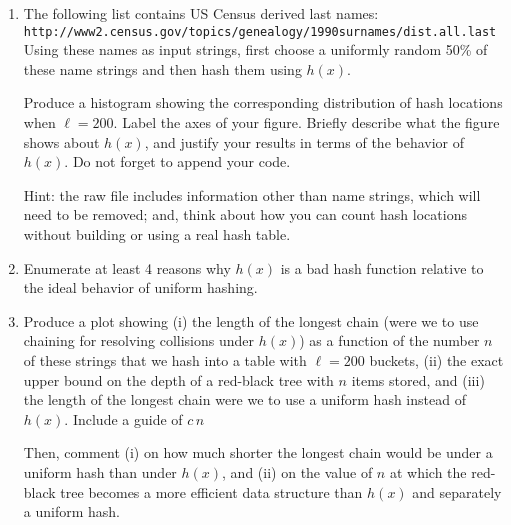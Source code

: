 \documentclass[12pt]{article}
\begin{document}
\begin{enumerate}
	\begin{enumerate}
    	\item The following list contains US Census derived last names: \\
    	{\tt http://www2.census.gov/topics/genealogy/1990surnames/dist.all.last} \\
    	Using these names as input strings, first choose a uniformly random 50\% of these name strings and then hash them using $h(x)$.
    	
    	Produce a histogram showing the corresponding distribution of hash locations when $\ell=200$. Label the axes of your figure. Briefly describe what the figure shows about $h(x)$, and justify your results in terms of the behavior of $h(x)$. Do not forget to append your code.
    	 
    	{\footnotesize Hint: the raw file includes information other than name strings, which will need to be removed; and, think about how you can count hash locations without building or using a real hash table.}
    	
    	\item Enumerate at least 4 reasons why $h(x)$ is a bad hash function relative to the ideal behavior of uniform hashing.
    	
    	\item Produce a plot showing (i) the length of the longest chain (were we to use chaining for resolving collisions under $h(x)$) as a function of the number $n$ of these strings that we hash into a table with $\ell=200$ buckets, (ii) the exact upper bound on the depth of a red-black tree with $n$ items stored, and (iii) the length of the longest chain were we to use a uniform hash instead of $h(x)$. Include a guide of $c\,n$
    	
    	Then, comment (i) on how much shorter the longest chain would be under a uniform hash than under $h(x)$, and (ii) on the value of $n$ at which the red-black tree becomes a more efficient data structure than $h(x)$ and separately a uniform hash.
	\end{enumerate}
	



\end{enumerate}
\end{document}
